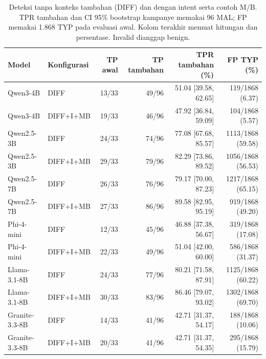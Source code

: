 \begin{table}[t]
\centering\small
\caption{Deteksi tanpa konteks tambahan (DIFF) dan dengan intent serta contoh M/B. TPR tambahan dan CI 95\% bootstrap kampanye memakai 96 MAL; FP memakai 1.868 TYP pada evaluasi awal. Kolom terakhir memuat hitungan dan persentase. Invalid dianggap benign.}
\label{tab:main}
\begin{tabular}{llrrrr}
\toprule
Model & Konfigurasi & TP awal & TP tambahan & TPR tambahan (\%) & FP TYP (\%) \\
\midrule
Qwen3-4B & DIFF & 13/33 & 49/96 & 51.04 [39.58, 62.65] & 119/1868 (6.37) \\
Qwen3-4B & DIFF+I+MB & 19/33 & 46/96 & 47.92 [36.84, 59.09] & 104/1868 (5.57) \\
Qwen2.5-3B & DIFF & 24/33 & 74/96 & 77.08 [67.68, 85.57] & 1113/1868 (59.58) \\
Qwen2.5-3B & DIFF+I+MB & 29/33 & 79/96 & 82.29 [73.86, 89.52] & 1056/1868 (56.53) \\
Qwen2.5-7B & DIFF & 26/33 & 76/96 & 79.17 [70.00, 87.23] & 1217/1868 (65.15) \\
Qwen2.5-7B & DIFF+I+MB & 27/33 & 86/96 & 89.58 [82.95, 95.19] & 919/1868 (49.20) \\
Phi-4-mini & DIFF & 12/33 & 45/96 & 46.88 [37.38, 56.67] & 319/1868 (17.08) \\
Phi-4-mini & DIFF+I+MB & 22/33 & 49/96 & 51.04 [42.00, 60.00] & 586/1868 (31.37) \\
Llama-3.1-8B & DIFF & 24/33 & 77/96 & 80.21 [71.58, 87.91] & 1125/1868 (60.22) \\
Llama-3.1-8B & DIFF+I+MB & 30/33 & 83/96 & 86.46 [79.07, 93.02] & 1302/1868 (69.70) \\
Granite-3.3-8B & DIFF & 14/33 & 41/96 & 42.71 [31.37, 54.17] & 188/1868 (10.06) \\
Granite-3.3-8B & DIFF+I+MB & 20/33 & 41/96 & 42.71 [31.37, 54.35] & 295/1868 (15.79) \\
\bottomrule
\end{tabular}
\end{table}
